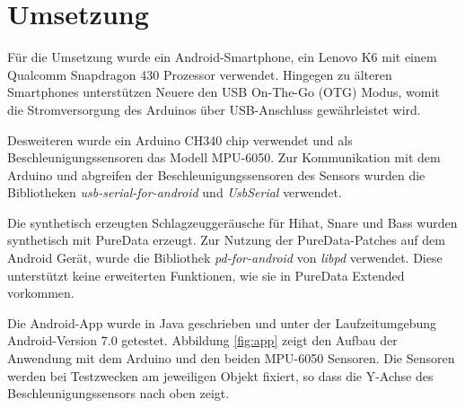 \section{Umsetzung}
Für die Umsetzung wurde ein Android-Smartphone, ein Lenovo K6 mit einem Qualcomm Snapdragon 430 Prozessor \cite{qualcomm} verwendet.
Hingegen zu älteren Smartphones unterstützen Neuere den USB On-The-Go (OTG) Modus, womit die Stromversorgung des Arduinos über USB-Anschluss gewährleistet wird.

Desweiteren wurde ein Arduino CH340 chip verwendet und als Beschleunigungssensoren das Modell MPU-6050.
Zur Kommunikation mit dem Arduino und abgreifen der Beschleunigungssensoren des Sensors wurden die Bibliotheken \textit{usb-serial-for-android} \cite{mik3y} und \textit{UsbSerial} \cite{felHR85} verwendet.

Die synthetisch erzeugten Schlagzeuggeräusche für Hihat, Snare und Bass wurden synthetisch mit PureData \cite{puredata} erzeugt. 
Zur Nutzung der PureData-Patches auf dem Android Gerät, wurde die Bibliothek \textit{pd-for-android} \cite{pdAndroid} von \textit{libpd} verwendet.
Diese unterstützt keine erweiterten Funktionen, wie sie in PureData Extended vorkommen.

Die Android-App wurde in Java geschrieben und unter der Laufzeitumgebung Android-Version 7.0 getestet.
Abbildung \ref{fig:app} zeigt den Aufbau der Anwendung mit dem Arduino und den beiden MPU-6050 Sensoren.
Die Sensoren werden bei Testzwecken am jeweiligen Objekt fixiert, so dass die Y-Achse des Beschleunigungssensors nach oben zeigt.


